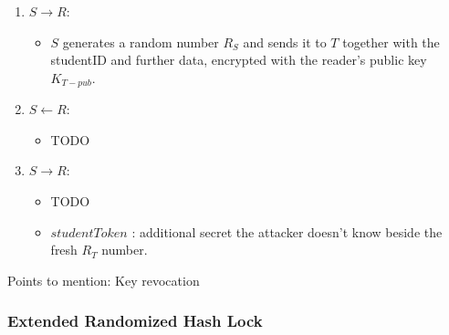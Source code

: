 \begin{enumerate}
	\item $ S \rightarrow R $:
	\begin{itemize}
		\item $ S $ generates a random number $ R_S $ and sends it to $ T $ together with the studentID and further data, encrypted with the reader's public key $ K_{T-pub} $.
	\end{itemize}	
	\item $ S \leftarrow R $:
	\begin{itemize}
		\item TODO
	\end{itemize}	
	\item $ S \rightarrow R $:
	\begin{itemize}
		\item TODO
		\item $ studentToken $ : additional secret the attacker doesn't know beside the fresh $ R_T $ number.
	\end{itemize}
\end{enumerate}

Points to mention:
Key revocation

\subsubsection{Extended Randomized Hash Lock}

